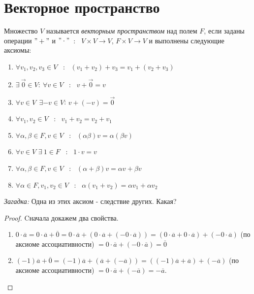 \section{Векторное пространство}
  \begin{definition}
    Множество $V$ называется \textit{векторным пространством} над полем $F$, если заданы операции $"+"$ и $"\cdot"$\ : \ $V\times V \to V$, $F \times V \to V$ и выполнены следующие аксиомы:
    \begin{enumerate}
        \item $\forall v_1, v_2, v_3\in V$ \ : \ $(v_1 + v_2) + v_3 = v_1 + (v_2 + v_3)$
        \item $\exists \ \vec 0 \in V:\ \forall v \in V$ \ : \ $v + \vec 0 = v$
        \item $\forall v \in V \ \ \exists  -v  \in V$: $v + (-v) = \vec 0$
        \item $\forall v_1, v_2 \in V$ \ : \ $v_1 + v_2 = v_2 + v_1$
        \item $\forall \alpha, \beta \in F, v \in V$ \ : \ $(\alpha \beta)v = \alpha (\beta v)$
        \item $\forall v \in V$ $\exists \ 1 \in F$ \ : \ $1 \cdot v = v$
        \item $\forall \alpha, \beta \in F, v \in V$ \ : \ $(\alpha + \beta)v = \alpha v + \beta v$
        \item $\forall \alpha \in F, v_1, v_2 \in V$ \ : \ $\alpha (v_1 + v_2) = \alpha v_1 + \alpha v_2$
    \end{enumerate}
    \textit{Загадка:} Одна из этих аксиом - следствие других. Какая?
    \begin{proof}
      Cначала докажем два свойства.
      \begin{enumerate}
        \item $0\cdot\overline{a} = 0\cdot\overline{a}+\overline{0} = 0\cdot\overline{a}+(0\cdot\overline{a}+(-0\cdot\overline{a})) = (0\cdot\overline{a}+0\cdot\overline{a}) + (-0\cdot\overline{a})$ (по аксиоме ассоциативности) $= 0\cdot\overline{a}+(-0\cdot\overline{a}) = \overline{0}$
        \item $(-1)\overline{a}+\overline{0} = (-1)\overline{a}+(\overline{a}+(-\overline{a})) = ((-1)\overline{a}+\overline{a})+(-\overline{a})$ (по аксиоме ассоциативности) $= 0\cdot\overline{a}+(-\overline{a}) = -\overline{a}$.

\end{enumerate}
\end{proof}
\end{definition}
